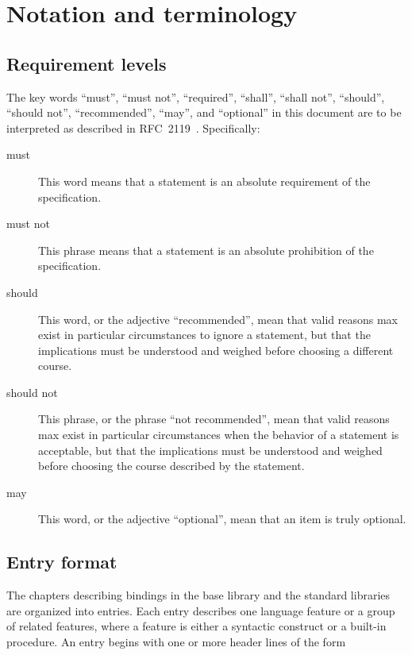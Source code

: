 \chapter{Notation and terminology}
\label{terminologychapter}

\section{Requirement levels} 
\label{requirementsection}

The key words ``must'', ``must not'', ``required'', ``shall'', ``shall
not'', ``should'', ``should not'', ``recommended'', ``may'', and
``optional'' in this document are to be interpreted as described in
RFC~2119~\cite{mustard}.  Specifically:

\begin{description}
\item[must] This word means that a statement is an absolute
  requirement of the specification.
\item[must not] This phrase means that a statement is an absolute
  prohibition of the specification.
\item[should] This word, or the adjective ``recommended'', mean that
  valid reasons max exist in particular circumstances to ignore a
  statement, but that the implications must be understood and weighed
  before choosing a different course.
\item[should not] This phrase, or the phrase ``not recommended'', mean
  that valid reasons max exist in particular circumstances when the
  behavior of a statement is acceptable, but that the implications
  must be understood and weighed before choosing the course described
  by the statement.
\item[may] This word, or the adjective ``optional'', mean that an item
  is truly optional.
\end{description}

\section{Entry format}

The chapters describing bindings in the base library and the standard
libraries are organized
into entries.  Each entry describes one language feature or a group of
related features, where a feature is either a syntactic construct or a
built-in procedure.  An entry begins with one or more header lines of the form

\noindent{}\unpenalty

